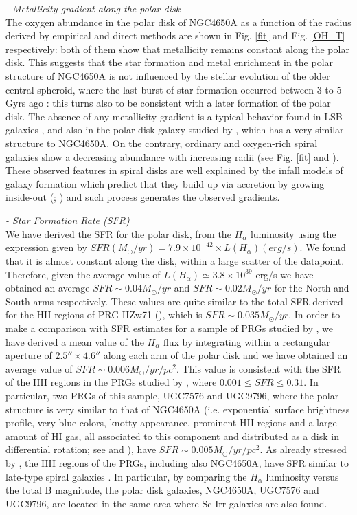 \documentclass[12pt,preprint]{aastex}
\begin{document}
{\it - Metallicity gradient along the polar disk}\\ The oxygen
abundance in the polar disk of NGC4650A as a function of the radius
derived by empirical and direct methods are shown in Fig. \ref{fit}
and Fig. \ref{OH_T} respectively: both of them show that metallicity
remains constant along the polar disk. This suggests that the star
formation and metal enrichment in the polar structure of NGC4650A is
not influenced by the stellar evolution of the older central spheroid,
where the last burst of star formation occurred between 3 to 5 Gyrs
ago \citep{Iod02}: this turns also to be consistent with a later
formation of the polar disk. The absence of any metallicity gradient
is a typical behavior found in LSB galaxies \citep{deB98}, and also in
the polar disk galaxy studied by \citet{Bro09}, which has a very
similar structure to NGC4650A. On the contrary, ordinary and
oxygen-rich spiral galaxies show a decreasing abundance with
increasing radii (see Fig. \ref{fit} and \citealt{Pil06}). These
observed features in spiral disks are well explained by the infall
models of galaxy formation which predict that they build up via
accretion by growing inside-out (\citealt{Mat89}; \citealt{Boi99}) and
such process generates the observed gradients.

{\it - Star Formation Rate (SFR)}\\ We have derived the SFR for the
polar disk, from the $H_{\alpha}$ luminosity using the expression
given by \citet{Ken98} $SFR (M_{\odot}/yr)= 7.9 \times 10^{-42} \times
L(H_{\alpha}) (erg/s)$. We found that it is almost constant along the disk,
within a large scatter of the datapoint. Therefore, given the average
value of $L(H_{\alpha}) \simeq 3.8 \times 10^{39}$ erg/s we have
obtained an average $SFR \sim 0.04 M_{\odot}/yr$ and $SFR \sim 0.02
M_{\odot}/yr$ for the North and South arms respectively. These values
are quite similar to the total SFR derived for the HII regions of PRG
IIZw71 (\citealt{Per09}), which is $SFR \sim 0.035 M_{\odot}/yr$.  In
order to make a comparison with SFR estimates for a sample of PRGs
studied by \citet{Res94}, we have derived a mean value of the
$H_{\alpha}$ flux by integrating within a rectangular aperture of
$2.5'' \times 4.6''$ along each arm of the polar disk and we have
obtained an average value of $SFR \sim 0.006
M_{\odot}/yr/pc^{2}$. This value is consistent with the SFR of the HII
regions in the PRGs studied by \citet{Res94}, where $0.001 \le SFR \le
0.31$. In particular, two PRGs of this sample, UGC7576 and UGC9796,
where the polar structure is very similar to that of NGC4650A
(i.e. exponential surface brightness profile, very blue colors, knotty
appearance, prominent HII regions and a large amount of HI gas, all
associated to this component and distributed as a disk in differential
rotation; see \citealt{Res94} and \citealt{Cox06}), have $SFR \sim
0.005 M_{\odot}/yr/pc^{2}$. As already stressed by \citet{Res94}, the
HII regions of the PRGs, including also NGC4650A, have SFR similar to
late-type spiral galaxies \citep{Ken87}. In particular, by comparing
the $H_{\alpha}$ luminosity versus the total B magnitude, the polar
disk galaxies, NGC4650A, UGC7576 and UGC9796, are located in the same
area where Sc-Irr galaxies are also found.
\end{document}
